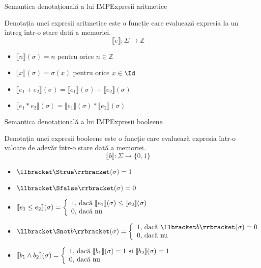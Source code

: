 \documentclass[xcolor=pdftex,romanian,colorlinks]{beamer}
\begin{document}
\begin{frame}{Semantica denotațională a lui IMP}{Expresii aritmetice}

  Denotația unei expresii aritmetice este o funcție care evaluează expresia la un întreg într-o stare dată a memoriei.
  $$\llbracket e \rrbracket : \Sigma \to \mathbb{Z}$$
  \begin{itemize}
  \item $\llbracket n \rrbracket(\sigma) = n$ pentru orice $n\in \mathbb{Z}$
  \item $\llbracket x \rrbracket(\sigma) = \sigma(x)$ pentru orice $x\in \Id$
  \item $\llbracket e_1 + e_2 \rrbracket(\sigma) = \llbracket e_1 \rrbracket(\sigma) + \llbracket e_2 \rrbracket(\sigma)$
  \item $\llbracket e_1 * e_2 \rrbracket(\sigma) = \llbracket e_1 \rrbracket(\sigma) * \llbracket e_2 \rrbracket(\sigma)$
  \end{itemize}
\end{frame}

\begin{frame}{Semantica denotațională a lui IMP}{Expresii booleene}

  Denotația unei expresii booleene este o funcție care evaluează expresia într-o valoare de adevăr într-o stare dată a memoriei.
  $$\llbracket b \rrbracket : \Sigma \to \{0, 1\}$$
  \begin{itemize}
  \item $\llbracket \Strue \rrbracket(\sigma) = 1$
  \item $\llbracket \Sfalse \rrbracket(\sigma) = 0$
  \item $\llbracket e_1 \leq e_2 \rrbracket(\sigma) = \left\{\begin{array}{r@{\mbox{, dacă }}l} 1 & \llbracket e_1 \rrbracket(\sigma) \leq \llbracket e_2 \rrbracket(\sigma)
  \\{} 0 & \mbox{nu}\end{array}\right.$
  \item $\llbracket \Snot b \rrbracket(\sigma) = \left\{\begin{array}{r@{\mbox{, dacă }}l} 1 & \llbracket b \rrbracket(\sigma) = 0
  \\{} 0 & \mbox{nu}\end{array}\right.$
  \item $\llbracket b_1 \wedge b_2 \rrbracket(\sigma) = \left\{\begin{array}{r@{\mbox{, dacă }}l} 1 & \llbracket b_1 \rrbracket(\sigma) = 1 \mbox{ și } \llbracket b_2 \rrbracket(\sigma) = 1
  \\{} 0 & \mbox{nu}\end{array}\right.$
  \end{itemize}
\end{frame}
\end{document}
